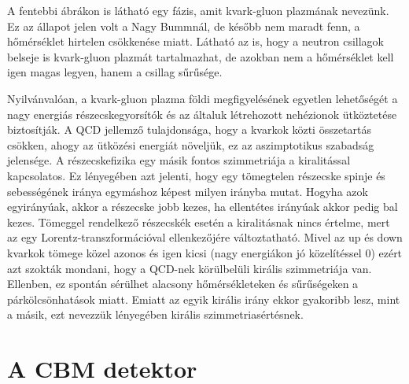 \documentclass[a4paper,12pt]{article}
\begin{document}
\par A fentebbi ábrákon is látható egy fázis, amit kvark-gluon plazmának nevezünk. Ez az állapot jelen volt a Nagy Bummnál, de később
nem maradt fenn, a hőmérséklet hirtelen csökkenése miatt. Látható az is, hogy a neutron csillagok belseje is kvark-gluon plazmát tartalmazhat,
de azokban nem a hőmérséklet kell igen magas legyen, hanem a csillag sűrűsége. 
\vspace{5mm}
\par Nyilvánvalóan, a kvark-gluon plazma földi megfigyelésének egyetlen lehetőségét a nagy energiás részecskegyorsítók és
az általuk létrehozott nehézionok ütköztetése biztosítják. 
A QCD jellemző tulajdonsága, hogy a kvarkok közti összetartás csökken, ahogy az ütközési energiát
növeljük, ez az aszimptotikus szabadság jelensége. A részecskefizika egy másik fontos
szimmetriája a kiralitással kapcsolatos. Ez lényegében azt jelenti, hogy egy tömegtelen részecske spinje és sebességének iránya egymáshoz 
képest milyen irányba mutat. Hogyha azok egyirányúak, akkor a részecske jobb kezes, ha ellentétes irányúak akkor pedig bal kezes. 
Tömeggel rendelkező részecskék esetén a kiralitásnak nincs értelme, mert az egy Lorentz-transzformációval ellenkezőjére változtatható. Mivel
az up és down kvarkok tömege közel azonos és igen kicsi (nagy energiákon jó közelítéssel 0)
ezért azt szokták mondani, hogy a QCD-nek körülbelüli királis szimmetriája van. Ellenben, ez spontán
sérülhet alacsony hőmérsékleteken és sűrűségeken a párkölcsönhatások miatt. Emiatt az egyik királis irány ekkor 
gyakoribb lesz, mint a másik, ezt nevezzük lényegében királis szimmetriasértésnek. 
\section{ A CBM detektor}
\end{document}
